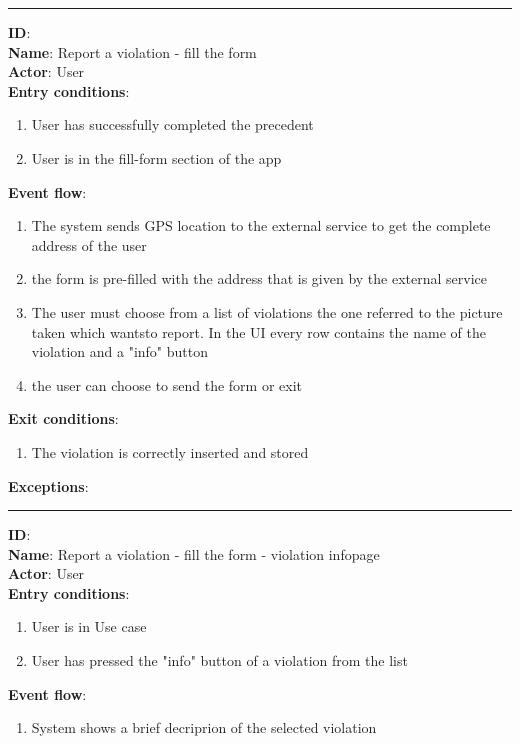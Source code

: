   \rule{\linewidth}{0.4pt}
  \textbf{ID}:  \\
  \textbf{Name}: Report a violation - fill the form \\
  \textbf{Actor}: User   \\
  \textbf{Entry conditions}:
  \begin{enumerate}
    \item{User has successfully completed the precedent }
    \item{User is in the fill-form section of the app}
  \end{enumerate}
  \textbf{Event flow}:
  \begin{enumerate}
    \item{The system sends GPS location to the external service to get the complete address of the user}
    \item{the form is pre-filled with the address that is given by the external service  }
    \item{The user must choose from a list of violations the one referred to the picture taken which wantsto report. In the UI every row contains the name of the violation and a "info" button}
    \item{the user can choose to send the form or exit}
  \end{enumerate}
  \textbf{Exit conditions}:
  \begin{enumerate}
    \item{The violation is correctly inserted and stored}
  \end{enumerate}
  \textbf{Exceptions}:
  \begin{enumerate}
  \end{enumerate}
  \rule{\linewidth}{0.4pt}
  \textbf{ID}:  \\
  \textbf{Name}: Report a violation - fill the form - violation infopage \\
  \textbf{Actor}: User   \\
  \textbf{Entry conditions}:
  \begin{enumerate}
    \item{User is in Use case  }
    \item{User has pressed the "info" button of a violation from the list }
  \end{enumerate}
  \textbf{Event flow}:
  \begin{enumerate}
    \item{System shows a brief decriprion of the selected violation}
  \end{enumerate}
